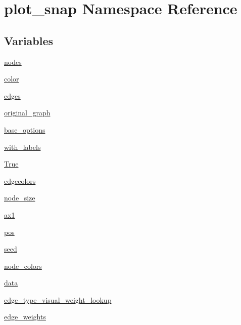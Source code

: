 \hypertarget{namespaceplot__snap}{}\section{plot\+\_\+snap Namespace Reference}
\label{namespaceplot__snap}
\subsection*{Variables}
\begin{DoxyCompactItemize}
\item 
\hyperlink{namespaceplot__snap_ad076a7e307570f5c3d2b0bfda1692df6}{nodes}
\item 
\hyperlink{namespaceplot__snap_a0257e07bbacbfe3cba63856672727653}{color}
\item 
\hyperlink{namespaceplot__snap_a0db16c15dc070e9e4738ca343b90f65d}{edges}
\item 
\hyperlink{namespaceplot__snap_a8c7ebc6a6d8daff03fcb57363bf68663}{original\+\_\+graph}
\item 
\hyperlink{namespaceplot__snap_a6023f7ab8f3c5b7292eb8407616d9a9c}{base\+\_\+options}
\item 
\hyperlink{namespaceplot__snap_a140264938327255f8f467945760813ac}{with\+\_\+labels}
\item 
\hyperlink{namespaceplot__snap_a6ada08502e761134d665850e2649b8e1}{True}
\item 
\hyperlink{namespaceplot__snap_a1954f04cc80bd518a1c7ef35d3e721b8}{edgecolors}
\item 
\hyperlink{namespaceplot__snap_afdaebc1b2cc5ce4ad2be2970ce409ac1}{node\+\_\+size}
\item 
\hyperlink{namespaceplot__snap_a1c3018eead7d1820f702a4ce7144aea2}{ax1}
\item 
\hyperlink{namespaceplot__snap_aef620191132792b8ed47ba963156ada0}{pos}
\item 
\hyperlink{namespaceplot__snap_a1c3e2d033d1bc4b4606b29783190a7d3}{seed}
\item 
\hyperlink{namespaceplot__snap_a57b32f264381ee6afdac171b080d7797}{node\+\_\+colors}
\item 
\hyperlink{namespaceplot__snap_a18906f38f2c6d8f0be1596426746cccd}{data}
\item 
\hyperlink{namespaceplot__snap_abbca126fd112ea9a5b8748c53eae0895}{edge\+\_\+type\+\_\+visual\+\_\+weight\+\_\+lookup}
\item 
\hyperlink{namespaceplot__snap_a2a27088a90f8caf3a96394e6e9dfdabd}{edge\+\_\+weights}
\item 

\end{DoxyCompactItemize}
